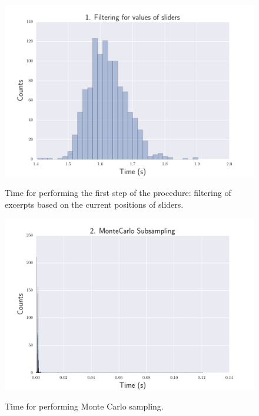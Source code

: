 \begin{figure}[htbp]
\begin{center}
\includegraphics[scale=0.7]{Figures/bench_sliders.pdf}
  \caption[Time for filtering music in regards to sliders' positions]{Time for performing the first step of the procedure: filtering of excerpts based on the current positions of sliders.}
  \label{fig:step1}
\vspace{2cm}
\includegraphics[scale=0.7]{Figures/bench_subsampling.pdf}
  \caption[Time for performing Monte Carlo sampling]{Time for performing Monte Carlo sampling.}
  \label{fig:step2}
\end{center}
\end{figure}

